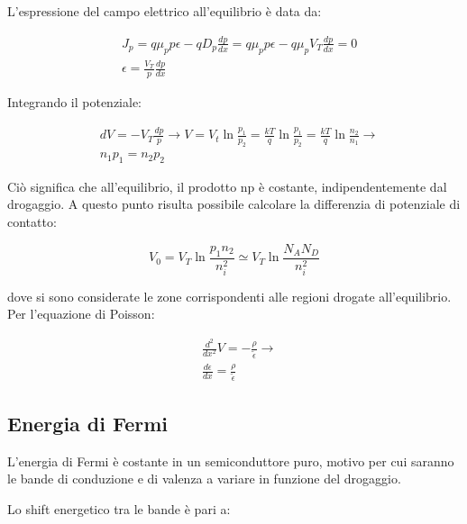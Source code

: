 \documentclass{article}
\begin{document}
L'espressione del campo elettrico all'equilibrio è data da:

\begin{equation}
    \begin{aligned}
         & J_p=q\mu_pp\epsilon-qD_p\frac{dp}{dx}=q\mu_pp\epsilon-q\mu_pV_T\frac{dp}{dx}=0 \\
         & \epsilon=\frac{V_T}{p}\frac{dp}{dx}
    \end{aligned}
\end{equation}

Integrando il potenziale:

\begin{equation}
    \begin{aligned}
         & dV=-V_T\frac{dp}{p} \rightarrow V=V_t\ln{\frac{p_1}{p_2}}=\frac{kT}{q}\ln{\frac{p_1}{p_2}}=\frac{kT}{q}\ln{\frac{n_2}{n_1}} \rightarrow \\
         & n_1p_1=n_2p_2
    \end{aligned}
\end{equation}

Ciò significa che all'equilibrio, il prodotto np è costante, indipendentemente dal drogaggio.
A questo punto risulta possibile calcolare la differenzia di potenziale di contatto:

\begin{equation}
    V_0=V_T \ln{\frac{p_1n_2}{n_i^2}} \simeq V_T\ln{\frac{N_AN_D}{n_i^2}}
\end{equation}

dove si sono considerate le zone corrispondenti alle regioni drogate all'equilibrio.
Per l'equazione di Poisson:

\begin{equation}
    \begin{aligned}
         & \frac{d^2}{dx^2} V=-\frac{\rho}{\tilde{\epsilon}}\rightarrow \\
         & \frac{d\epsilon}{dx}=\frac{\rho}{\tilde{\epsilon}}
    \end{aligned}
\end{equation}

\subsection{Energia di Fermi}
L'energia di Fermi è costante in un semiconduttore puro, motivo per cui saranno le bande di conduzione e di valenza a variare in funzione del drogaggio.

Lo shift energetico tra le bande è pari a:
\end{document}
